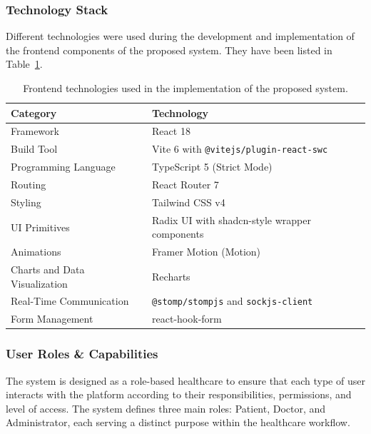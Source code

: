 \subsubsection{Technology Stack}
Different technologies were used during the development and implementation of the frontend components of the proposed system. They have been listed in Table~\ref{tab:frontend_technologies}.
\begin{table}[htbp]
	\centering
	\caption{Frontend technologies used in the implementation of the proposed system.}
	\label{tab:frontend_technologies}
	\begin{tabular}{|p{4cm}|p{8.5cm}|}
		\hline
		\textbf{Category} & \textbf{Technology} \\
		\hline
		
		Framework &
		React 18 \\
		\hline
		
		Build Tool &
		Vite 6 with \texttt{@vitejs/plugin-react-swc} \\
		\hline
		
		Programming Language &
		TypeScript 5 (Strict Mode) \\
		\hline
		
		Routing &
		React Router 7 \\
		\hline
		
		Styling &
		Tailwind CSS v4 \\
		\hline
		
		UI Primitives &
		Radix UI with shadcn-style wrapper components \\
		\hline
		
		Animations &
		Framer Motion (Motion) \\
		\hline
		
		Charts and Data Visualization &
		Recharts \\
		\hline
		
		Real-Time Communication &
		\texttt{@stomp/stompjs} and \texttt{sockjs-client} \\
		\hline
		
		Form Management &
		react-hook-form \\
		\hline
		
	\end{tabular}
\end{table}

\subsubsection{User Roles \& Capabilities}
The system is designed as a role-based healthcare to ensure that each type of user interacts with the platform according to their responsibilities, permissions, and level of access. The system defines three main roles: Patient, Doctor, and Administrator, each serving a distinct purpose within the healthcare workflow.

